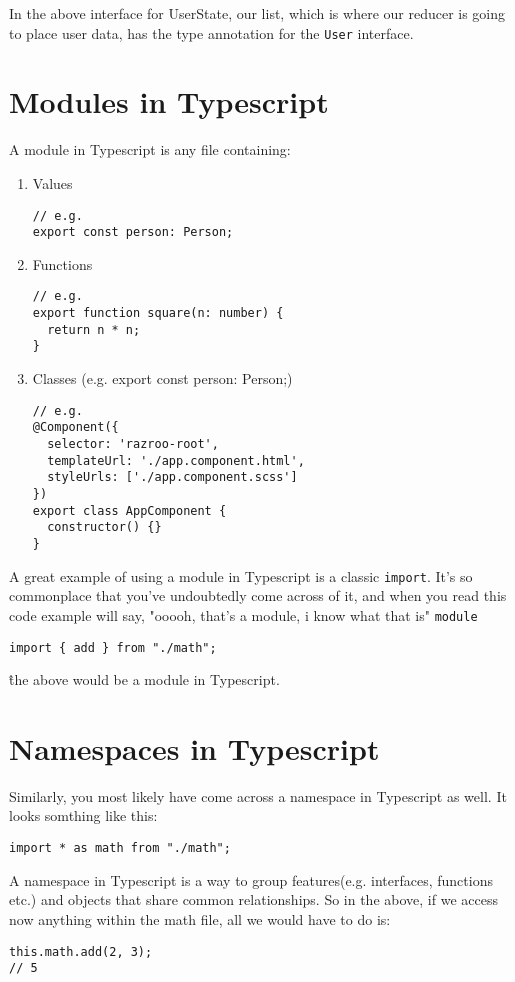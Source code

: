 In the above interface for UserState, our list, which is where our reducer is going to place user data, has the type annotation for the \lstinline{User} interface.

\section{Modules in Typescript}
A module in Typescript is any file containing: 
\begin{enumerate}
  \item Values 
\begin{verbatim}
// e.g.  
export const person: Person;  
\end{verbatim}  
\item Functions
\begin{verbatim}
// e.g. 
export function square(n: number) {
  return n * n;
}
\end{verbatim}
\item Classes (e.g. export const person: Person;)
\begin{verbatim}
// e.g.
@Component({
  selector: 'razroo-root',
  templateUrl: './app.component.html',
  styleUrls: ['./app.component.scss']
})
export class AppComponent {
  constructor() {}
}
\end{verbatim}
\end{enumerate}

A great example of using a module in Typescript is a classic \lstinline{import}. It's so commonplace that you've undoubtedly come across of it, and when you read this code example will say, "ooooh, that's a module, i know what that is" \lstinline{module}
\begin{lstlisting}
import { add } from "./math";
\end{lstlisting}

\^ the above would be a module in Typescript.

\section{Namespaces in Typescript}
Similarly, you most likely have come across a namespace in Typescript as well. It looks somthing like this:
\begin{lstlisting}
import * as math from "./math";
\end{lstlisting}
A namespace in Typescript is a way to group features(e.g. interfaces, functions etc.) and objects that share common relationships. So in the above, if we access now anything within the math file, all we would have to do is:
\begin{verbatim}
this.math.add(2, 3);
// 5  
\end{verbatim}

